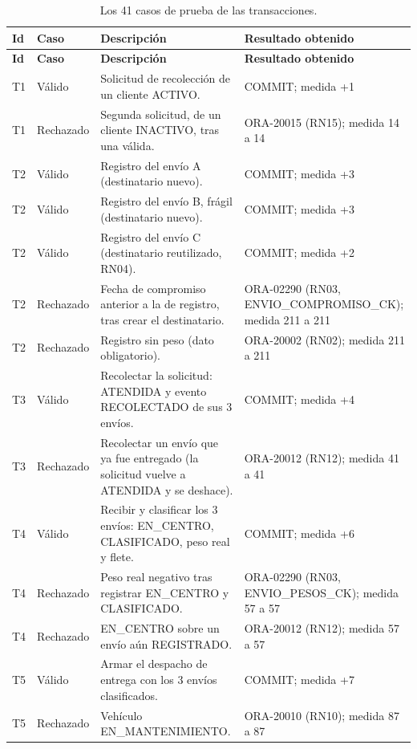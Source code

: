 {\singlespacing\footnotesize
\begin{longtable}{L{0.9cm} L{1.5cm} L{7.0cm} L{4.4cm}}
\caption{Los 41 casos de prueba de las transacciones.}
\label{tab:proto-casos}\\
\toprule
\textbf{Id} & \textbf{Caso} & \textbf{Descripción} & \textbf{Resultado obtenido} \\
\midrule
\endfirsthead
\toprule
\textbf{Id} & \textbf{Caso} & \textbf{Descripción} & \textbf{Resultado obtenido} \\
\midrule
\endhead
\bottomrule
\endfoot
T1 & Válido & Solicitud de recolección de un cliente ACTIVO. & COMMIT; medida +1 \\
T1 & Rechazado & Segunda solicitud, de un cliente INACTIVO, tras una válida. & ORA-20015 (RN15); medida 14 a 14 \\
T2 & Válido & Registro del envío A (destinatario nuevo). & COMMIT; medida +3 \\
T2 & Válido & Registro del envío B, frágil (destinatario nuevo). & COMMIT; medida +3 \\
T2 & Válido & Registro del envío C (destinatario reutilizado, RN04). & COMMIT; medida +2 \\
T2 & Rechazado & Fecha de compromiso anterior a la de registro, tras crear el destinatario. & ORA-02290 (RN03, ENVIO\_COMPROMISO\_CK); medida 211 a 211 \\
T2 & Rechazado & Registro sin peso (dato obligatorio). & ORA-20002 (RN02); medida 211 a 211 \\
T3 & Válido & Recolectar la solicitud: ATENDIDA y evento RECOLECTADO de sus 3 envíos. & COMMIT; medida +4 \\
T3 & Rechazado & Recolectar un envío que ya fue entregado (la solicitud vuelve a ATENDIDA y se deshace). & ORA-20012 (RN12); medida 41 a 41 \\
T4 & Válido & Recibir y clasificar los 3 envíos: EN\_CENTRO, CLASIFICADO, peso real y flete. & COMMIT; medida +6 \\
T4 & Rechazado & Peso real negativo tras registrar EN\_CENTRO y CLASIFICADO. & ORA-02290 (RN03, ENVIO\_PESOS\_CK); medida 57 a 57 \\
T4 & Rechazado & EN\_CENTRO sobre un envío aún REGISTRADO. & ORA-20012 (RN12); medida 57 a 57 \\
T5 & Válido & Armar el despacho de entrega con los 3 envíos clasificados. & COMMIT; medida +7 \\
T5 & Rechazado & Vehículo EN\_MANTENIMIENTO. & ORA-20010 (RN10); medida 87 a 87 \\

\end{longtable}}
